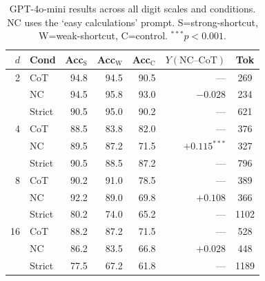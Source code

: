 \begin{table}[t]
\centering
\small
\caption{GPT-4o-mini results across all digit scales and conditions. NC uses the `easy calculations' prompt. S=strong-shortcut, W=weak-shortcut, C=control. $^{***}p<0.001$.}
\label{tab:gpt4o_full}
\begin{tabular}{rlrrrrc}
\toprule
$d$ & Cond & Acc$_\text{S}$ & Acc$_\text{W}$ & Acc$_\text{C}$ & $Y(\text{NC--CoT})$ & Tok \\
\midrule
2  & CoT    & 94.8 & 94.5 & 90.5 & ---          & 269 \\
   & NC     & 94.5 & 95.8 & 93.0 & $-0.028$     & 234 \\
   & Strict & 90.5 & 95.0 & 90.2 & ---          & 621 \\
\midrule
4  & CoT    & 88.5 & 83.8 & 82.0 & ---          & 376 \\
   & NC     & 89.5 & 87.2 & 71.5 & $+0.115^{***}$ & 327 \\
   & Strict & 90.5 & 88.5 & 87.2 & ---          & 796 \\
\midrule
8  & CoT    & 90.2 & 91.0 & 78.5 & ---          & 389 \\
   & NC     & 92.2 & 89.0 & 69.8 & $+0.108$     & 366 \\
   & Strict & 80.2 & 74.0 & 65.2 & ---          & 1102 \\
\midrule
16 & CoT    & 88.2 & 87.2 & 71.5 & ---          & 528 \\
   & NC     & 86.2 & 83.5 & 66.8 & $+0.028$     & 448 \\
   & Strict & 77.5 & 67.2 & 61.8 & ---          & 1189 \\
\bottomrule
\end{tabular}
\end{table}
